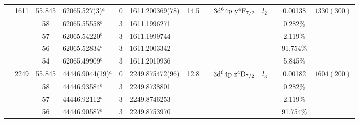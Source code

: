 \begin{table*}
\begin{center}
{\begin{tabular}{:l;l;c;l;c;l;c;l;l;c;c;c;c}
                                  & 1611   & 55.845    & 62065.527(3)$^{a}$               & 0 &   1611.200369(78)  & 14.5 & $                                        $ & $3\rm{d}^64\rm{p~y}^4\rm{F}_{7/2}        $ & $l_{2} $ &              & 0.00138   & $ 1330(300)$\\
\rowstyle{\itshape}               &        & 58        & 62065.55558$^{b}$                & 3 &  1611.1996271      &      & $                                        $ & $                                        $ & $      $ &              & 0.282\%   & $          $\\
\rowstyle{\itshape}               &        & 57        & 62065.54220$^{b}$                & 3 &  1611.1999744      &      & $                                        $ & $                                        $ & $      $ &              & 2.119\%   & $          $\\
\rowstyle{\itshape}               &        & 56        & 62065.52834$^{b}$                & 3 &  1611.2003342      &      & $                                        $ & $                                        $ & $      $ &              & 91.754\%  & $          $\\
\rowstyle{\itshape}               &        & 54        & 62065.49909$^{b}$                & 3 &  1611.2010936      &      & $                                        $ & $                                        $ & $      $ &              & 5.845\%   & $          $\\
                                  & 2249   & 55.845    & 44446.9044(19)$^{a}$             & 0 &   2249.875472(96)  & 12.8 & $                                        $ & $3\rm{d}^64\rm{p~z}^4\rm{D}_{7/2}        $ & $l_{3} $ &              & 0.00182   & $ 1604(200)$\\
\rowstyle{\itshape}               &        & 58        & 44446.93584$^{b}$                & 3 &  2249.8738801      &      & $                                        $ & $                                        $ & $      $ &              & 0.282\%   & $          $\\
\rowstyle{\itshape}               &        & 57        & 44446.92112$^{b}$                & 3 &  2249.8746253      &      & $                                        $ & $                                        $ & $      $ &              & 2.119\%   & $          $\\
\rowstyle{\itshape}               &        & 56        & 44446.90587$^{b}$                & 3 &  2249.8753970      &      & $                                        $ & $                                        $ & $      $ &              & 91.754\%  & $          $\\

\end{tabular}}
\end{center}
\end{table*}
